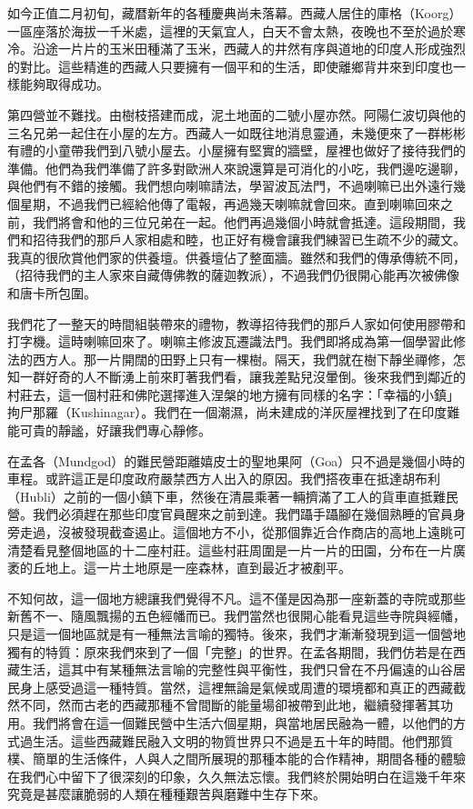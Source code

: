 如今正值二月初旬，藏暦新年的各種慶典尚未落幕。西藏人居住的庫格（Koorg）一區座落於海拔一千米處，這裡的天氣宜人，白天不會太熱，夜晚也不至於過於寒冷。沿途一片片的玉米田種滿了玉米，西藏人的井然有序與道地的印度人形成強烈的對比。這些精進的西藏人只要擁有一個平和的生活，即使離鄉背井來到印度也一樣能夠取得成功。

第四營並不難找。由樹枝搭建而成，泥土地面的二號小屋亦然。阿陽仁波切與他的三名兄弟一起住在小屋的左方。西藏人一如既往地消息靈通，未幾便來了一群彬彬有禮的小童帶我們到八號小屋去。小屋擁有堅實的牆壁，屋裡也做好了接待我們的準備。他們為我們準備了許多對歐洲人來說還算是可消化的小吃，我們邊吃邊聊，與他們有不錯的接觸。我們想向喇嘛請法，學習波瓦法門，不過喇嘛已出外遠行幾個星期，不過我們已經給他傳了電報，再過幾天喇嘛就會回來。直到喇嘛回來之前，我們將會和他的三位兄弟在一起。他們再過幾個小時就會抵達。這段期間，我們和招待我們的那戶人家相處和睦，也正好有機會讓我們練習已生疏不少的藏文。我真的很欣賞他們家的供養壇。供養壇佔了整面牆。雖然和我們的傳承傳統不同，（招待我們的主人家來自藏傳佛教的薩迦教派），不過我們仍很開心能再次被佛像和唐卡所包圍。

我們花了一整天的時間組裝帶來的禮物，教導招待我們的那戶人家如何使用膠帶和打字機。這時喇嘛回來了。喇嘛主修波瓦遷識法門。我們即將成為第一個學習此修法的西方人。那一片開闊的田野上只有一棵樹。隔天，我們就在樹下靜坐禪修，怎知一群好奇的人不斷湧上前來盯著我們看，讓我差點兒沒暈倒。後來我們到鄰近的村莊去，這一個村莊和佛陀選擇進入涅槃的地方擁有同樣的名字：「幸福的小鎮」拘尸那羅（Kushinagar）。我們在一個潮濕，尚未建成的洋灰屋裡找到了在印度難能可貴的靜謐，好讓我們專心靜修。

在孟各（Mundgod）的難民營距離嬉皮士的聖地果阿（Goa）只不過是幾個小時的車程。或許這正是印度政府嚴禁西方人出入的原因。我們搭夜車在抵達胡布利（Hubli）之前的一個小鎮下車，然後在清晨乘著一輛擠滿了工人的貨車直抵難民營。我們必須趕在那些印度官員醒來之前到達。我們躡手躡腳在幾個熟睡的官員身旁走過，沒被發現截查遏止。這個地方不小，從那個靠近合作商店的高地上遠眺可清楚看見整個地區的十二座村莊。這些村莊周圍是一片一片的田園，分布在一片廣袤的丘地上。這一片土地原是一座森林，直到最近才被剷平。

不知何故，這一個地方總讓我們覺得不凡。這不僅是因為那一座新蓋的寺院或那些新舊不一、隨風飄揚的五色經幡而已。我們當然也很開心能看見這些寺院與經幡，只是這一個地區就是有一種無法言喻的獨特。後來，我們才漸漸發現到這一個營地獨有的特質：原來我們來到了一個「完整」的世界。在孟各期間，我們仿若是在西藏生活，這其中有某種無法言喻的完整性與平衡性，我們只曾在不丹偏遠的山谷居民身上感受過這一種特質。當然，這裡無論是氣候或周遭的環境都和真正的西藏截然不同，然而古老的西藏那種不曾間斷的能量場卻被帶到此地，繼續發揮著其功用。我們將會在這一個難民營中生活六個星期，與當地居民融為一體，以他們的方式過生活。這些西藏難民融入文明的物質世界只不過是五十年的時間。他們那質樸、簡單的生活條件，人與人之間所展現的那種本能的合作精神，期間各種的體驗在我們心中留下了很深刻的印象，久久無法忘懷。我們終於開始明白在這幾千年來究竟是甚麼讓脆弱的人類在種種艱苦與磨難中生存下來。

